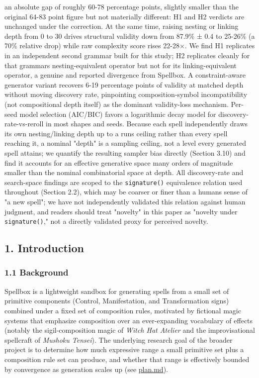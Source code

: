 \documentclass[
  10pt,
  twocolumn]{article}
\begin{document}
an absolute gap of roughly 60-78 percentage points, slightly smaller
than the original 64-83 point figure but not materially different: H1
and H2 verdicts are unchanged under the correction. At the same time,
raising nesting or linking depth from 0 to 30 drives structural validity
down from 87.9\% ± 0.4 to 25-26\% (a 70\% relative drop) while raw
complexity score rises 22-28×. We find H1 replicates in an independent
second grammar built for this study; H2 replicates cleanly for that
grammar\textquotesingle s nesting-equivalent operator but not for its
linking-equivalent operator, a genuine and reported divergence from
Spellbox. A constraint-aware generator variant recovers 6-19 percentage
points of validity at matched depth without moving discovery rate,
pinpointing composition-symbol incompatibility (not compositional depth
itself) as the dominant validity-loss mechanism. Per-seed model
selection (AIC/BIC) favors a logarithmic decay model for
discovery-rate-vs-reroll in most shapes and seeds. Because each spell
independently draws its own nesting/linking depth up to a
run\textquotesingle s ceiling rather than every spell reaching it, a
nominal "depth" is a sampling ceiling, not a level every generated spell
attains; we quantify the resulting sampler bias directly (Section 3.10)
and find it accounts for an effective generative space many orders of
magnitude smaller than the nominal combinatorial space at depth. All
discovery-rate and search-space findings are scoped to the
\texttt{signature()} equivalence relation used throughout (Section 2.2),
which may be coarser or finer than a human\textquotesingle s sense of "a
new spell"; we have not independently validated this relation against
human judgment, and readers should treat "novelty" in this paper as
"novelty under \texttt{signature()}," not a directly validated proxy for
perceived novelty.

\subsection{1. Introduction}\label{1-introduction}

\subsubsection{1.1 Background}\label{11-background}

Spellbox is a lightweight sandbox for generating spells from a small set
of primitive components (Control, Manifestation, and Transformation
signs) combined under a fixed set of composition rules, motivated by
fictional magic systems that emphasize composition over an
ever-expanding vocabulary of effects (notably the sigil-composition
magic of \emph{Witch Hat Atelier} and the improvisational spellcraft of
\emph{Mushoku Tensei}). The underlying research goal of the broader
project is to determine how much expressive range a small primitive set
plus a composition rule set can produce, and whether that range is
effectively bounded by convergence as generation scales up (see
\href{../plan.md}{plan.md}).
\end{document}
